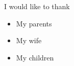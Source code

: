 \documentclass[a4paper, 11pt, oneside]{Thesis}
\newcommand\blankpage{%
	\null
	\thispagestyle{empty}%
	\addtocounter{page}{-1}%
	\newpage}
\begin{document}

%
%
%
%

%	
%

\newenvironment{acknowledgements}%
{\cleardoublepage\thispagestyle{empty}\null\vfill\begin{center}%
		\bfseries Acknowledgements\end{center}}%
{\vfill\null}

I would like to thank

\begin{itemize}
	\item My parents
	\item My wife 
	\item My children
\end{itemize}


\afterpage{\blankpage}

\pagestyle{fancy}  %


\tableofcontents  %

\listoffigures  %
\end{document}
